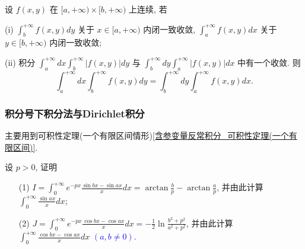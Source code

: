 \documentclass[lang=cn,newtx,10pt,scheme=chinese]{elegantbook}
\begin{document}
\begin{theorem*}
设 $f(x, y)$ 在 $[a, +\infty) \times [b, +\infty)$ 上连续, 若

(i) $\int_{b}^{+\infty} f(x, y) dy$ 关于 $x \in [a, +\infty)$ 内闭一致收敛, $\int_{a}^{+\infty} f(x, y) dx$ 关于 $y \in [b, +\infty)$ 内闭一致收敛;

(ii) 积分 $\int_{a}^{+\infty} dx \int_{b}^{+\infty} |f(x, y)| dy$ 与 $\int_{b}^{+\infty} dy \int_{a}^{+\infty} |f(x, y)| dx$ 中有一个收敛.
则
$$ \int_{a}^{+\infty} dx \int_{b}^{+\infty} f(x, y) dy = \int_{b}^{+\infty} dy \int_{a}^{+\infty} f(x, y) dx. $$
\end{theorem*}


\subsubsection{积分号下积分法与Dirichlet积分}
主要用到可积性定理(一个有限区间情形)\ref{含参变量反常积分_可积性定理(一个有限区间)}.

\begin{example}[$\bigstar \bigstar \bigstar$]\label{ex13.2.30}
设 $p>0$, 证明
\begin{enumerate}
    \item[(1)] $I = \int_{0}^{+\infty} e^{-px} \frac{\sin bx - \sin ax}{x} dx = \arctan\frac{b}{p} - \arctan\frac{a}{p}$, 并由此计算 $\int_{0}^{+\infty} \frac{\sin ax}{x} dx$;
    \item[(2)] $J = \int_{0}^{+\infty} e^{-px} \frac{\cos bx - \cos ax}{x} dx = -\frac{1}{2} \ln \frac{b^2 + p^2}{a^2 + p^2}$, 并由此计算 $\int_{0}^{+\infty} \frac{\cos bx - \cos ax}{x} dx$ \textcolor{blue}{$(a,b \neq 0)$.}
\end{enumerate}
\end{example}
\end{document}
